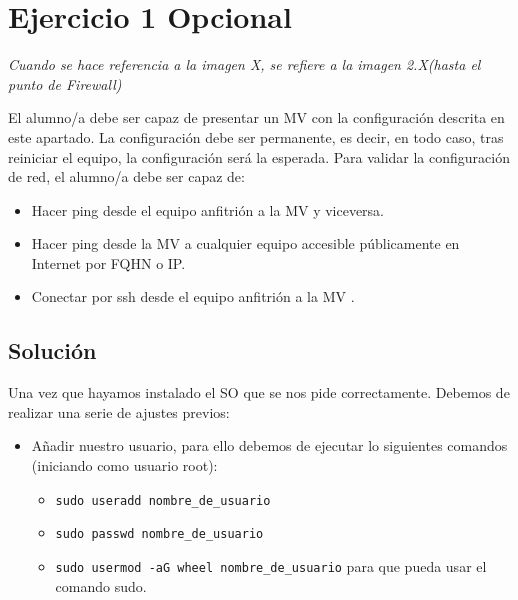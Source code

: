 
\section{Ejercicio 1 Opcional}
\begin{tcolorbox}[colback=yellow!5!white,colframe=yellow!75!black]
    \textit{Cuando se hace referencia a la imagen X, se refiere a la imagen 2.X(hasta el punto de Firewall)}
  
\end{tcolorbox}

El alumno/a debe ser capaz de presentar un MV con la configuración descrita en este apartado. La configuración debe ser permanente, es decir, en todo caso, tras reiniciar el equipo, la configuración será la esperada.
Para validar la configuración de red, el alumno/a debe ser capaz de:
\begin{itemize}
    \item Hacer ping desde el equipo anfitrión a la MV y viceversa.
    \item Hacer ping desde la MV a cualquier equipo accesible públicamente en Internet por FQHN o IP.
    \item Conectar por ssh desde el equipo anfitrión a la MV .
\end{itemize}

\subsection{Solución}
Una vez que hayamos instalado el SO que se nos pide correctamente. Debemos de realizar una serie de ajustes previos:
\begin{itemize}
    \item Añadir nuestro usuario, para ello debemos de ejecutar lo siguientes comandos (iniciando como usuario root):
    \begin{itemize}
        \item \texttt{sudo useradd nombre\_de\_usuario}        
        \item \texttt{sudo passwd nombre\_de\_usuario}
        \item \texttt{sudo usermod -aG wheel nombre\_de\_usuario} para que pueda usar el comando sudo.
    \end{itemize}
\end{itemize}

